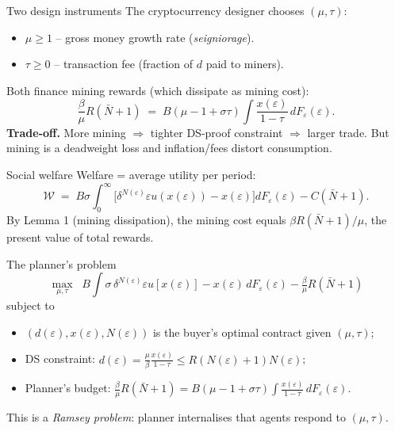 \documentclass[aspectratio=169,xcolor=dvipsnames]{beamer}
\begin{document}
\begin{frame}{Two design instruments}
    The cryptocurrency designer chooses $(\mu,\tau)$:
    \vspace{2mm}
    \begin{itemize}
        \item $\mu \ge 1$ -- gross money growth rate (\emph{seigniorage}).
        \item $\tau \ge 0$ -- transaction fee (fraction of $d$ paid to miners).
    \end{itemize}
    \vspace{3mm}
    Both finance mining rewards (which dissipate as mining cost):
    \[
        \frac{\beta}{\mu} R(\bar N+1) \;=\; B(\mu - 1 + \sigma\tau)\!\int \frac{x(\varepsilon)}{1-\tau}\,dF_\varepsilon(\varepsilon).
    \]
    \vspace{1mm}
    \textbf{Trade-off.} More mining $\Rightarrow$ tighter DS-proof constraint $\Rightarrow$ larger trade.
    But mining is a deadweight loss and inflation/fees distort consumption.
\end{frame}

\begin{frame}{Social welfare}
    Welfare = average utility per period:
    \[
        \mathcal{W} \;=\; B\sigma\!\int_0^\infty \bigl[\delta^{N(\varepsilon)}\varepsilon u(x(\varepsilon)) - x(\varepsilon)\bigr] dF_\varepsilon(\varepsilon) - C(\bar N+1). \tag{37}
    \]
    \vspace{1mm}
    By Lemma 1 (mining dissipation), the mining cost equals $\beta R(\bar N+1)/\mu$,
    the present value of total rewards.
\end{frame}

\begin{frame}{The planner's problem}
    \[
        \max_{\mu,\tau} \;\; B\!\int \!\sigma\,\delta^{N(\varepsilon)}\varepsilon u[x(\varepsilon)] - x(\varepsilon)\,dF_\varepsilon(\varepsilon) - \tfrac{\beta}{\mu}R(\bar N+1) \tag{38}
    \]
    subject to
    \begin{itemize}
        \item $(d(\varepsilon),x(\varepsilon),N(\varepsilon))$ is the buyer's optimal contract given $(\mu,\tau)$;
        \item DS constraint: $d(\varepsilon) = \frac{\mu}{\beta}\frac{x(\varepsilon)}{1-\tau} \le R(N(\varepsilon)+1)N(\varepsilon)$;
        \item Planner's budget: $\tfrac{\beta}{\mu}R(\bar N+1) = B(\mu - 1 + \sigma\tau)\!\int\!\tfrac{x(\varepsilon)}{1-\tau}\,dF_\varepsilon(\varepsilon)$.
    \end{itemize}
    \vspace{2mm}
    This is a \emph{Ramsey problem}: planner internalises that agents respond to $(\mu,\tau)$.
\end{frame}
\end{document}
